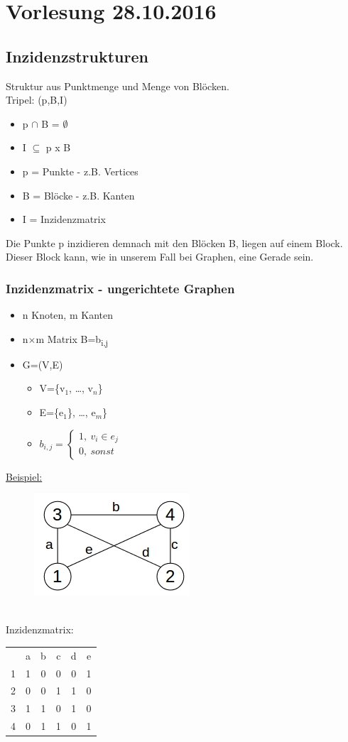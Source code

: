 \section{Vorlesung 28.10.2016}
\subsection{Inzidenzstrukturen}
Struktur aus Punktmenge und Menge von Blöcken.\\
Tripel: (p,B,I)
\begin{itemize}
	\item p $\cap$ B = $\emptyset$
	\item I $\subseteq$ p x B
	\item p = Punkte - z.B. Vertices
	\item B = Blöcke - z.B. Kanten
	\item I = Inzidenzmatrix
\end{itemize}
Die Punkte p \glqq inzidieren\grqq{} demnach mit den Blöcken B, \glqq liegen auf\grqq{} einem Block. Dieser Block kann, wie in unserem Fall bei Graphen, eine Gerade sein.

\subsubsection{Inzidenzmatrix - ungerichtete Graphen}
\begin{itemize}
	\item n Knoten, m Kanten
	\item n$\times$m Matrix B=b\textsubscript{i,j}
	\item G=(V,E)
	\begin{itemize}
		\item V=\{v$_1$, \ldots, v$_n$\}
		\item E=\{e$_1$\}, \ldots, e$_m$\}
		\item $b_{i,j}=
			\begin{cases}
				1,\>v_{i}\in e_j\\
				0,\>sonst
			\end{cases}$
	\end{itemize}
\end{itemize}

\underline{Beispiel:}
\begin{figure}[htp]
\includegraphics[scale=1.00]{lectures/161028/pix/pic1.jpg}
\end{figure}
\\
Inzidenzmatrix: 
\begin{tabular}{cccccc}
  & a & b & c & d & e\\
1 & 1 & 0 & 0 & 0 & 1\\
2 & 0 & 0 & 1 & 1 & 0\\
3 & 1 & 1 & 0 & 1 & 0\\
4 & 0 & 1 & 1 & 0 & 1\\
\end{tabular}

